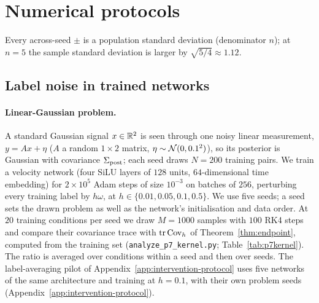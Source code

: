 \documentclass{article} %
\theoremstyle{plain}
\theoremstyle{definition}
\theoremstyle{remark}
\begin{document}
\section{Numerical protocols}
\label{app:expdetails}

Every across-seed $\pm$ is a population standard deviation (denominator $n$); at $n=5$ the
sample standard deviation is larger by $\sqrt{5/4}\approx1.12$.

\subsection{Label noise in trained networks}
\label{app:kernel-protocol}

\paragraph{Linear-Gaussian problem.} A standard Gaussian signal $x\in\mathbb{R}^2$ is seen through one noisy
linear measurement, $y=Ax+\eta$ ($A$ a random $1\times2$ matrix, $\eta\sim\mathcal{N}(0,0.1^2)$), so its
posterior is Gaussian with covariance $\Sigma_{\mathrm{post}}$; each seed draws $N=200$ training pairs. We train
a velocity network (four SiLU layers of $128$ units, $64$-dimensional time embedding) for
$2\times10^5$ Adam steps of size $10^{-3}$ on batches of $256$, perturbing every training label by
$h\omega$, at $h\in\{0.01,0.05,0.1,0.5\}$. We use five seeds; a seed sets the drawn problem as well
as the network's initialisation and data order. At $20$ training conditions per seed we draw $M=1000$
samples with $100$ RK4 steps and compare their covariance trace with $\operatorname{tr}\operatorname{Cov}_h$ of
Theorem~\ref{thm:endpoint}, computed from the training set (\texttt{analyze\_p7\_kernel.py};
Table~\ref{tab:p7kernel}). The ratio is averaged over conditions within a seed and then over
seeds. The label-averaging pilot of Appendix~\ref{app:intervention-protocol} uses five networks of the
same architecture and training at $h=0.1$, with their own problem seeds
(Appendix~\ref{app:intervention-protocol}).
\end{document}
